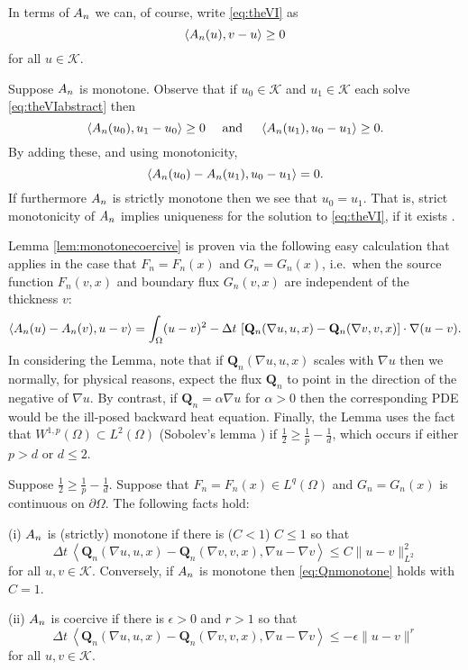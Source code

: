 \documentclass[final,leqno,onefignum,onetabnum]{siamltex1213bueler}
\newcommand\bQ{\mathbf{Q}}
\newcommand\eps{\epsilon}
\renewcommand{\grad}{\nabla}
\newcommand{\ip}[2]{\ensuremath{\left<#1,#2\right>}}
\begin{document}
In terms of $A_{n}$ we can, of course, write \eqref{eq:theVI} as
\begin{equation}
  \ip{\An(u)}{v-u} \ge 0 \label{eq:theVIabstract}
\end{equation}
for all $u \in \mathcal{K}$.

Suppose $A_{n}$ is monotone.  Observe that if $u_0 \in \mathcal{K}$ and $u_1 \in \mathcal{K}$ each solve \eqref{eq:theVIabstract} then
    $$\ip{\An(u_0)}{u_1-u_0} \ge 0 \quad \text{ and } \quad \ip{\An(u_1)}{u_0-u_1} \ge 0.$$
By adding these, and using monotonicity,
    $$\ip{\An(u_0) - \An(u_1)}{u_0 - u_1} = 0.$$
If furthermore $A_{n}$ is strictly monotone then we see that $u_0=u_1$.  That is, strict monotonicity of $A_{n}$ implies uniqueness for the solution to \eqref{eq:theVI}, if it exists \cite[chapter III]{KinderlehrerStampacchia}.

Lemma \ref{lem:monotonecoercive} is proven via the following easy calculation that applies in the case that $F_n=F_n(x)$ and $G_n=G_n(x)$, i.e.~when the source function $F_n(v,x)$ and boundary flux $G_n(v,x)$ are independent of the thickness $v$:
   $$\ip{\An(u) - \An(v)}{u-v} = \int_\Omega (u-v)^2 - \Delta t\, \left[\bQ_n(\grad u,u,x) - \bQ_n(\grad v,v,x)\right] \cdot \grad(u-v).$$
In considering the Lemma, note that if $\bQ_n(\grad u,u,x)$ scales with $\grad u$ then we normally, for physical reasons, expect the flux $\bQ_n$ to point in the direction of the negative of $\grad u$.  By contrast, if $\bQ_n = \alpha \grad u$ for $\alpha>0$ then the corresponding PDE would be the ill-posed backward heat equation.  Finally, the Lemma uses the fact that $W^{1,p}(\Omega) \subset L^2(\Omega)$ (Sobolev's lemma \cite[theorems 5.6.2 and 5.6.5]{Evans}) if $\frac{1}{2} \ge \frac{1}{p} - \frac{1}{d}$, which occurs if either $p>d$ or $d\le 2$.

\begin{lemma}  \label{lem:monotonecoercive}  Suppose $\frac{1}{2} \ge \frac{1}{p} - \frac{1}{d}$.  Suppose that $F_n=F_n(x)\in L^q(\Omega)$ and $G_n=G_n(x)$ is continuous on $\partial \Omega$.  The following facts hold:

(i)  $A_{n}$ is (strictly) monotone if there is ($C<1$) $C\le 1$ so that
\begin{equation}
\Delta t\,\ip{\bQ_n(\grad u,u,x) - \bQ_n(\grad v,v,x)}{\grad u - \grad v} \le C \|u-v\|_{L^2}^2 \label{eq:Qnmonotone}
\end{equation}
for all $u,v \in \mathcal{K}$.  Conversely, if $A_{n}$ is monotone then \eqref{eq:Qnmonotone} holds with $C=1$.

(ii)  $A_{n}$ is coercive if there is $\eps>0$ and $r>1$ so that
\begin{equation}
\Delta t\,\ip{\bQ_n(\grad u,u,x) - \bQ_n(\grad v,v,x)}{\grad u - \grad v} \le -\eps \|u-v\|^r \label{eq:Qncoercive}
\end{equation}
for all $u,v \in \mathcal{K}$.
\end{lemma}
\end{document}
